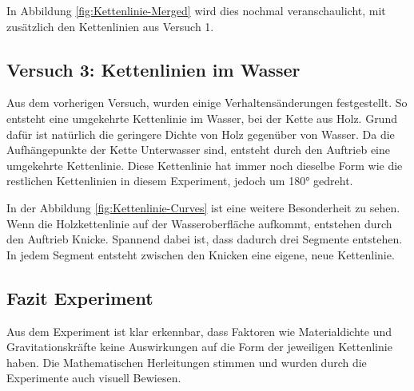In Abbildung \ref{fig:Kettenlinie-Merged} wird dies nochmal veranschaulicht, mit zusätzlich den Kettenlinien aus Versuch 1.

\subsection{Versuch 3: Kettenlinien im Wasser
\label{kettenlinie:subsection:wasser}}

Aus dem vorherigen Versuch, wurden einige Verhaltensänderungen festgestellt.
So entsteht eine umgekehrte Kettenlinie im Wasser, bei der Kette aus Holz.
Grund dafür ist natürlich die geringere Dichte von Holz gegenüber von Wasser.
Da die Aufhängepunkte der Kette Unterwasser sind, entsteht durch den Auftrieb eine umgekehrte Kettenlinie.
Diese Kettenlinie hat immer noch dieselbe Form wie die restlichen Kettenlinien in diesem Experiment, jedoch um 180° gedreht.

In der Abbildung \ref{fig:Kettenlinie-Curves} ist eine weitere Besonderheit zu sehen.
Wenn die Holzkettenlinie auf der Wasseroberfläche aufkommt, entstehen durch den Auftrieb Knicke.
Spannend dabei ist, dass dadurch drei Segmente entstehen.
In jedem Segment entsteht zwischen den Knicken eine eigene, neue Kettenlinie.

\subsection{Fazit Experiment
\label{kettenlinie:subsection:fazit-experiment}}
Aus dem Experiment ist klar erkennbar, dass Faktoren wie Materialdichte und Gravitationskräfte keine Auswirkungen auf die Form der jeweiligen Kettenlinie haben.
Die Mathematischen Herleitungen stimmen und wurden durch die Experimente auch visuell Bewiesen.
